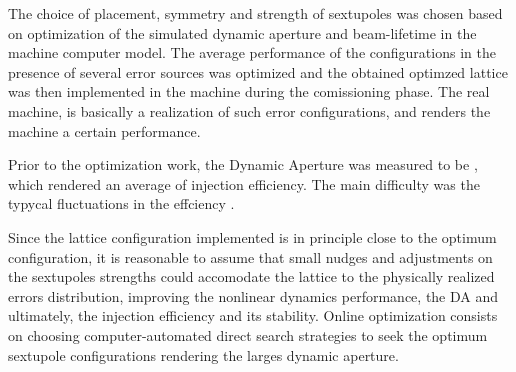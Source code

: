     The choice of placement, symmetry and strength of sextupoles was chosen based on optimization of the simulated dynamic aperture and beam-lifetime in the machine computer model. The average performance of the configurations in the presence of several error sources was optimized and the obtained optimzed lattice was then implemented in the machine during the comissioning phase. The real machine, is basically a realization of such error configurations, and renders the machine a certain performance.

    Prior to the optimization work, the Dynamic Aperture was measured to be , which rendered an average of  injection efficiency. The main difficulty was the typycal fluctuations in the effciency .

    Since the lattice configuration implemented is in principle close to the optimum configuration, it is reasonable to assume that small nudges and adjustments on the sextupoles strengths could accomodate the lattice to the physically realized errors distribution, improving the nonlinear dynamics performance, the DA and ultimately, the injection efficiency and its stability. Online optimization consists on choosing computer-automated direct search strategies to seek the optimum sextupole configurations rendering the larges dynamic aperture.